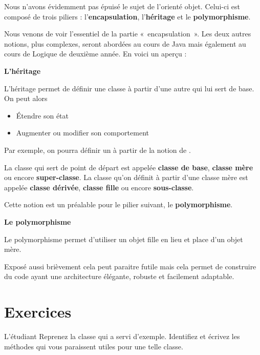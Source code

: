 Nous n'avons évidemment pas épuisé le sujet de
l'orienté objet. Celui-ci est composé de trois piliers
: l'\textbf{encapsulation},
l'\textbf{héritage} et le \textbf{polymorphisme}.

Nous venons de voir l'essentiel de la partie
«~encapsulation~». Les deux autres notions, plus complexes, seront
abordées au cours de Java mais également au cours de Logique de
deuxième année. En voici un aperçu :

{\sffamily\bfseries\upshape
L'héritage}

{L’héritage permet de définir une classe à partir d’une autre qui lui
sert de base.} 
On peut alors

\liststyleListv
\begin{itemize}
	\item {
		Étendre son état}
	\item {
		Augmenter ou modifier son comportement}
\end{itemize}

Par exemple, on pourra définir un  à partir
de la notion de .

La classe qui sert de point de départ est appelée \textbf{classe de
base}, \textbf{classe mère} ou encore \textbf{super-classe}. La classe
qu’on définit à partir d’une classe mère est appelée \textbf{classe
dérivée}, \textbf{classe fille} ou encore \textbf{sous-classe}.

Cette notion est un préalable pour le pilier suivant, le
\textbf{polymorphisme}.

{\sffamily\bfseries\upshape
Le polymorphisme}

{
Le polymorphisme permet d’utiliser un objet fille en lieu et place d’un
objet mère.} 

{Exposé aussi brièvement cela peut paraitre futile mais cela
permet de construire du code ayant une architecture élégante, robuste
et facilement adaptable.}


\section{Exercices}

\begin{Exercice}{L'étudiant}
	Reprenez la classe  qui a servi
	d'exemple. Identifiez et écrivez les méthodes qui vous
	paraissent utiles pour une telle classe.
\end{Exercice}

